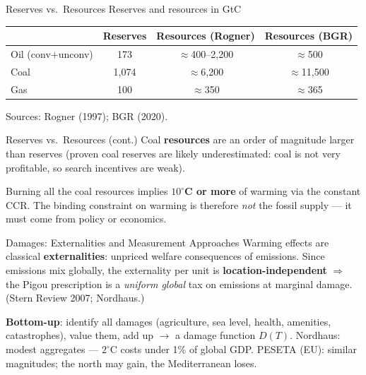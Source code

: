 \documentclass[blue]{beamer}
\begin{document}
\begin{frame}{Reserves vs.\ Resources}
Reserves and resources in GtC
\begin{table}
\centering
\small
\setlength{\tabcolsep}{4pt}
\begin{tabular}{lccc}
\toprule
 & Reserves & Resources (Rogner) & Resources (BGR) \\
\midrule
Oil (conv$+$unconv) & 173 & $\approx$400--2,200 & $\approx$500 \\
Coal & 1,074 & $\approx$6,200 & $\approx$11,500 \\
Gas & 100 & $\approx$350 & $\approx$365 \\
\bottomrule
\end{tabular}
\end{table}
\vspace{-5pt}
{\small Sources: Rogner (1997); BGR (2020).}

\end{frame}

\begin{frame}{Reserves vs.\ Resources (cont.)}
\bigskip
Coal \textbf{resources} are an order of magnitude larger than reserves (proven coal reserves are likely underestimated: coal is not very profitable, so search incentives are weak).

\bigskip
Burning all the coal resources implies \textbf{$10^{\circ}$C or more} of warming via the constant CCR. The binding constraint on warming is therefore \emph{not} the fossil supply --- it must come from policy or economics.
\end{frame}

\begin{frame}{Damages: Externalities and Measurement Approaches}
Warming effects are classical \textbf{externalities}: unpriced welfare consequences of emissions. Since emissions mix globally, the externality per unit is \textbf{location-independent} $\Rightarrow$ the Pigou prescription is a \emph{uniform global} tax on emissions at marginal damage. (Stern Review 2007; Nordhaus.)

\bigskip
\textbf{Bottom-up}: identify all damages (agriculture, sea level, health, amenities, catastrophes), value them, add up $\to$ a damage function $D(T)$. Nordhaus: modest aggregates --- $2^{\circ}$C costs under 1\% of global GDP. PESETA (EU): similar magnitudes; the north may gain, the Mediterranean loses.

\end{frame}
\end{document}
